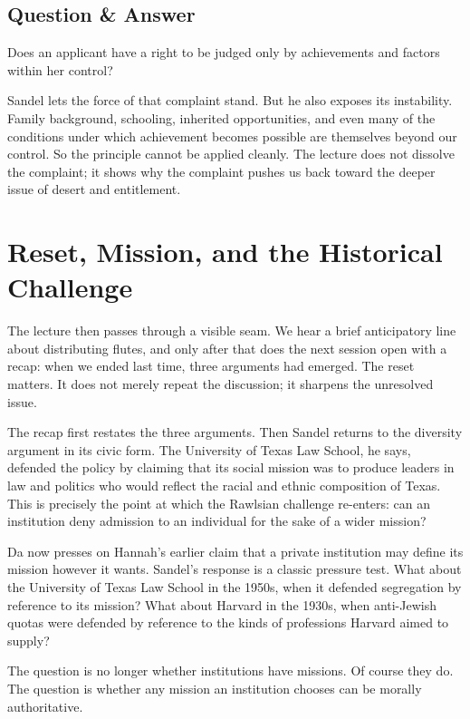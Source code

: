 \subsection{Question \& Answer}

Does an applicant have a right to be judged only by achievements and factors within her control?

Sandel lets the force of that complaint stand. But he also exposes its instability. Family background, schooling, inherited opportunities, and even many of the conditions under which achievement becomes possible are themselves beyond our control. So the principle cannot be applied cleanly. The lecture does not dissolve the complaint; it shows why the complaint pushes us back toward the deeper issue of desert and entitlement.

\section{Reset, Mission, and the Historical Challenge}

The lecture then passes through a visible seam. We hear a brief anticipatory line about distributing flutes, and only after that does the next session open with a recap: when we ended last time, three arguments had emerged. The reset matters. It does not merely repeat the discussion; it sharpens the unresolved issue.

The recap first restates the three arguments. Then Sandel returns to the diversity argument in its civic form. The University of Texas Law School, he says, defended the policy by claiming that its social mission was to produce leaders in law and politics who would reflect the racial and ethnic composition of Texas. This is precisely the point at which the Rawlsian challenge re-enters: can an institution deny admission to an individual for the sake of a wider mission?

Da now presses on Hannah's earlier claim that a private institution may define its mission however it wants. Sandel's response is a classic pressure test. What about the University of Texas Law School in the 1950s, when it defended segregation by reference to its mission? What about Harvard in the 1930s, when anti-Jewish quotas were defended by reference to the kinds of professions Harvard aimed to supply?

The question is no longer whether institutions have missions. Of course they do. The question is whether any mission an institution chooses can be morally authoritative.

